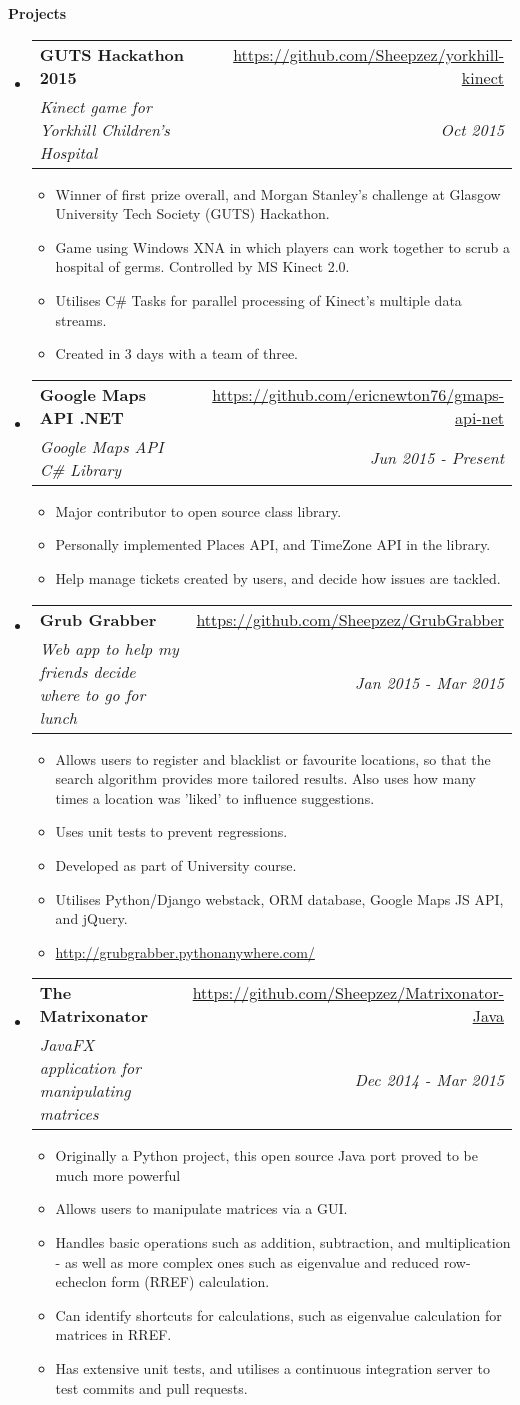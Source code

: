 \documentclass[letterpaper,11pt]{article}
\makeatletter
\newcommand{\resitem}[1]{\item #1 \vspace{-2pt}}
\newcommand{\resheading}[1]{{\large \colorbox{mygrey}{\begin{minipage}{\textwidth}{\textbf{#1 \vphantom{p\^{E}}}}\end{minipage}}}}
\newcommand{\ressubheading}[4]{
\begin{tabular*}{7.0in}{l@{\extracolsep{\fill}}r}
	\textbf{#1} & #2 \\
	\textit{#3} & \textit{#4} \\
\end{tabular*}\vspace{-6pt}}
\makeatother
\begin{document}
	\pagebreak

	\resheading{Projects}
	\begin{itemize}
		\item
		\ressubheading{GUTS Hackathon 2015}{\url{https://github.com/Sheepzez/yorkhill-kinect}}
		{Kinect game for Yorkhill Children's Hospital}{Oct 2015}
		\begin{itemize}
			\resitem{Winner of first prize overall, and Morgan Stanley's challenge at Glasgow University Tech Society (GUTS) Hackathon.}
			\resitem{Game using Windows XNA in which players can work together to scrub a hospital of germs. Controlled by MS Kinect 2.0.}
			\resitem{Utilises C\# Tasks for parallel processing of Kinect's multiple data streams.}
			\resitem{Created in 3 days with a team of three.}
		\end{itemize}

		\item
		\ressubheading{Google Maps API .NET}{\url{https://github.com/ericnewton76/gmaps-api-net}}
		{Google Maps API C\# Library}{Jun 2015 - Present}
		\begin{itemize}
			\resitem{Major contributor to open source class library.}
			\resitem{Personally implemented Places API, and TimeZone API in the library.}
			\resitem{Help manage tickets created by users, and decide how issues are tackled.}
		\end{itemize}

		\item
		\ressubheading{Grub Grabber}{\url{https://github.com/Sheepzez/GrubGrabber}}
		{Web app to help my friends decide where to go for lunch}{Jan 2015 - Mar 2015}
		\begin{itemize}
			\resitem{Allows users to register and blacklist or favourite locations, so that the search algorithm provides more tailored results. Also uses how many times a location was 'liked' to influence suggestions.}
			\resitem{Uses unit tests to prevent regressions.}
			\resitem{Developed as part of University course.}
			\resitem{Utilises Python/Django webstack, ORM database, Google Maps JS API, and jQuery.}
			\resitem{\url{http://grubgrabber.pythonanywhere.com/}}
		\end{itemize}

		\item
		\ressubheading{The Matrixonator}{\url{https://github.com/Sheepzez/Matrixonator-Java}}
		{JavaFX application for manipulating matrices}{Dec 2014 - Mar 2015}
		\begin{itemize}
			\resitem{Originally a Python project, this open source Java port proved to be much more powerful}
			\resitem{Allows users to manipulate matrices via a GUI.}
			\resitem{Handles basic operations such as addition, subtraction, and multiplication - as well as
			more complex ones such as eigenvalue and reduced row-echeclon form (RREF) calculation.}
			\resitem{Can identify shortcuts for calculations, such as eigenvalue calculation for matrices in RREF.}
			\resitem{Has extensive unit tests, and utilises a continuous integration server to test commits and pull requests.}
		\end{itemize}


\end{itemize}
\end{document}
